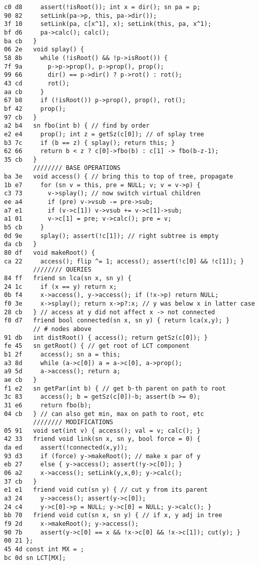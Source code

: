 \documentclass[11pt, a4paper, twoside]{article}
\begin{document}
\begin{lstlisting}
c0 d8     assert(!isRoot()); int x = dir(); sn pa = p;
90 82     setLink(pa->p, this, pa->dir());
3f 10     setLink(pa, c[x^1], x); setLink(this, pa, x^1);
bf d6     pa->calc(); calc();
ba cb   }
06 2e   void splay() {
58 8b     while (!isRoot() && !p->isRoot()) {
7f 9a       p->p->prop(), p->prop(), prop();
99 66       dir() == p->dir() ? p->rot() : rot();
43 cd       rot();
aa cb     }
67 b8     if (!isRoot()) p->prop(), prop(), rot();
bf 42     prop();
97 cb   }
a2 b4   sn fbo(int b) { // find by order
e2 e4     prop(); int z = getSz(c[0]); // of splay tree
b3 7c     if (b == z) { splay(); return this; }
62 66     return b < z ? c[0]->fbo(b) : c[1] -> fbo(b-z-1);
35 cb   }
        //////// BASE OPERATIONS
ba 3e   void access() { // bring this to top of tree, propagate
1b e7     for (sn v = this, pre = NULL; v; v = v->p) {
c3 73       v->splay(); // now switch virtual children
ee a4       if (pre) v->vsub -= pre->sub;
a7 e1       if (v->c[1]) v->vsub += v->c[1]->sub;
a1 01       v->c[1] = pre; v->calc(); pre = v;
b5 cb     }
0d 9e     splay(); assert(!c[1]); // right subtree is empty
da cb   }
80 df   void makeRoot() { 
ca 22     access(); flip ^= 1; access(); assert(!c[0] && !c[1]); }
        //////// QUERIES
84 ff   friend sn lca(sn x, sn y) {
24 1c     if (x == y) return x;
0b f4     x->access(), y->access(); if (!x->p) return NULL;
f0 3e     x->splay(); return x->p?:x; // y was below x in latter case
28 cb   } // access at y did not affect x -> not connected
f0 d7   friend bool connected(sn x, sn y) { return lca(x,y); } 
        // # nodes above
91 db   int distRoot() { access(); return getSz(c[0]); } 
fe 45   sn getRoot() { // get root of LCT component
b1 2f     access(); sn a = this; 
a3 8d     while (a->c[0]) a = a->c[0], a->prop();
a9 5d     a->access(); return a;
ae cb   }
f1 e2   sn getPar(int b) { // get b-th parent on path to root
3c 83     access(); b = getSz(c[0])-b; assert(b >= 0);
31 e6     return fbo(b);
04 cb   } // can also get min, max on path to root, etc
        //////// MODIFICATIONS
05 91   void set(int v) { access(); val = v; calc(); } 
42 33   friend void link(sn x, sn y, bool force = 0) { 
da ed     assert(!connected(x,y)); 
93 d3     if (force) y->makeRoot(); // make x par of y
eb 27     else { y->access(); assert(!y->c[0]); }
06 a2     x->access(); setLink(y,x,0); y->calc();
37 cb   }
e1 e1   friend void cut(sn y) { // cut y from its parent
a3 24     y->access(); assert(y->c[0]);
24 c4     y->c[0]->p = NULL; y->c[0] = NULL; y->calc(); }
bb 70   friend void cut(sn x, sn y) { // if x, y adj in tree
f9 2d     x->makeRoot(); y->access(); 
90 7b     assert(y->c[0] == x && !x->c[0] && !x->c[1]); cut(y); }
00 21 };
45 4d const int MX = ;
bc 0d sn LCT[MX];


\end{lstlisting}
\end{document}
